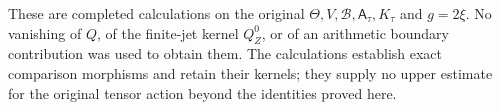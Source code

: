 \documentclass[
  11pt,
]{article}
\begin{document}
These are completed calculations on the original
\(\Theta,V,\mathscr B,\mathsf A_\tau,K_\tau\) and \(g=2\xi\). No
vanishing of \(Q\), of the finite-jet kernel \(Q_Z^0\), or of an
arithmetic boundary contribution was used to obtain them. The
calculations establish exact comparison morphisms and retain their
kernels; they supply no upper estimate for the original tensor action
beyond the identities proved here.
\end{document}
